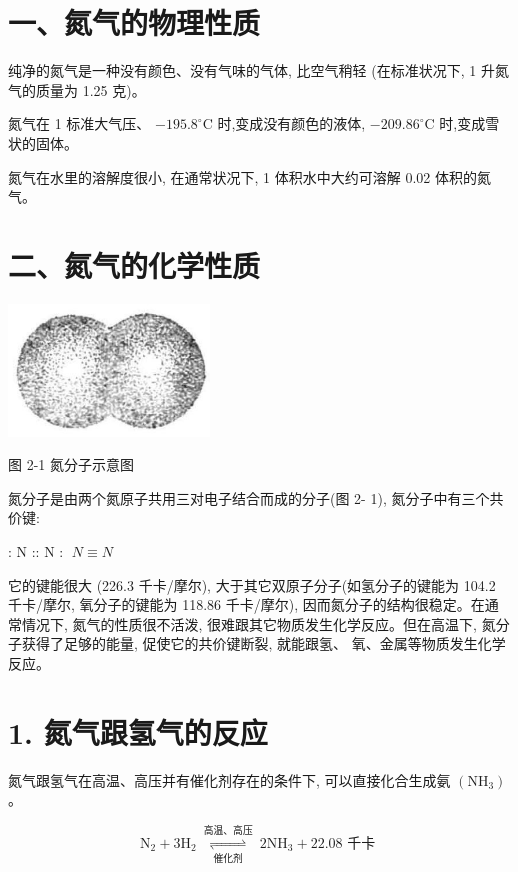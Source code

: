 \documentclass[10pt]{article}
\begin{document}
\section*{一、氮气的物理性质}

纯净的氮气是一种没有颜色、没有气味的气体, 比空气稍轻 (在标准状况下, 1 升氮气的质量为 1.25 克)。

氮气在 1 标准大气压、 \(- {195.8}^{ \circ }\mathrm{C}\) 时,变成没有颜色的液体, \(- {209.86}^{ \circ }\mathrm{C}\) 时,变成雪状的固体。

氮气在水里的溶解度很小, 在通常状况下, 1 体积水中大约可溶解 0.02 体积的氮气。

\section*{二、氮气的化学性质}

\begin{center}
\includegraphics[max width=0.4\textwidth]{images/01912d13-9986-7822-a012-3f3f7be99dcb_37_708916.jpg}
\end{center}

图 2-1 氮分子示意图

氮分子是由两个氮原子共用三对电子结合而成的分子(图 2- 1), 氮分子中有三个共价键:

: N :: N : \(\;N \equiv N\)

它的键能很大 (226.3 千卡/摩尔), 大于其它双原子分子(如氢分子的键能为 104.2 千卡/摩尔, 氧分子的键能为 118.86 千卡/摩尔), 因而氮分子的结构很稳定。在通常情况下, 氮气的性质很不活泼, 很难跟其它物质发生化学反应。但在高温下, 氮分子获得了足够的能量, 促使它的共价键断裂, 就能跟氢、 氧、金属等物质发生化学反应。

\section*{1. 氮气跟氢气的反应}

氮气跟氢气在高温、高压并有催化剂存在的条件下, 可以直接化合生成氨 \(\left( {\mathrm{{NH}}}_{3}\right)\) 。

\[
{\mathrm{N}}_{2} + 3{\mathrm{H}}_{2}\underset{\text{ 催化剂 }}{\overset{\text{ 高温、高压 }}{ \rightleftharpoons }}2{\mathrm{{NH}}}_{3} + {22.08}\text{ 千卡 }
\]
\end{document}
